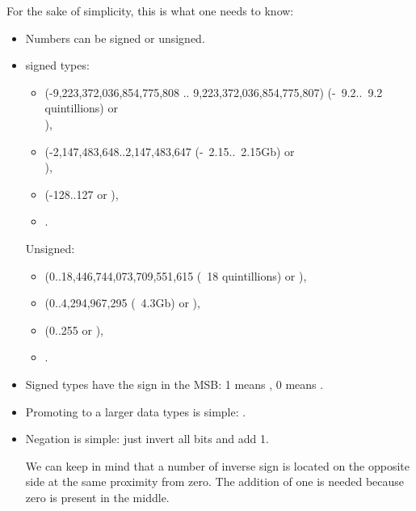 For the sake of simplicity, this is what one needs to know:

\begin{itemize}
\item Numbers can be signed or unsigned.

\item \CCpp signed types:

  \begin{itemize}
    \item {} (-9,223,372,036,854,775,808 .. 9,223,372,036,854,775,807)
	  (-~9.2..~9.2 quintillions) or \\
                ),
    \item \Tint (-2,147,483,648..2,147,483,647 (-~2.15..~2.15Gb) or \\
	    ),
    \item \Tchar (-128..127 or ),
    \item {}.
   \end{itemize}

	Unsigned:
  \begin{itemize}
	  \item {} (0..18,446,744,073,709,551,615 
		  (~18 quintillions) or ),
   \item {} (0..4,294,967,295 (~4.3Gb) or ),
   \item {} (0..255 or ), 
   \item {}.
  \end{itemize}

\item Signed types have the sign in the \ac{MSB}: 1 means , 0 means .

\item Promoting to a larger data types is simple:
.

\label{sec:signednumbers:negation}
\item Negation is simple: just invert all bits and add 1.

We can keep in mind that a number of inverse sign is located on the opposite side at the same proximity from zero.
The addition of one is needed because zero is present in the middle.


\end{itemize}
